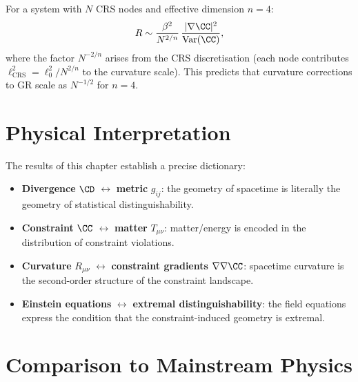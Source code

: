 \begin{corollary}\label{cor:15.5}
For a system with $N$ CRS nodes and effective dimension $n = 4$:
\begin{equation}\label{eq:observable-scaling}
  R \sim \frac{\beta^2}{N^{2/n}}\,
  \frac{|\nabla\CC|^2}{\mathrm{Var}(\CC)},
\end{equation}
where the factor $N^{-2/n}$ arises from the CRS discretisation
(each node contributes $\ell_{\mathrm{CRS}}^2 = \ell_0^2/N^{2/n}$
to the curvature scale).  This predicts that curvature corrections
to GR scale as $N^{-1/2}$ for $n = 4$.
\end{corollary}

\section{Physical Interpretation}
\label{sec:ch15:interpretation}

\begin{remark}[Interpretation: Information $=$ Geometry $=$ Gravity]
The results of this chapter establish a precise dictionary:
\begin{itemize}
  \item \textbf{Divergence} $\CD$ $\leftrightarrow$ \textbf{metric}
        $g_{ij}$: the geometry of spacetime is literally the geometry
        of statistical distinguishability.
  \item \textbf{Constraint} $\CC$ $\leftrightarrow$ \textbf{matter}
        $T_{\mu\nu}$: matter/energy is encoded in the distribution of
        constraint violations.
  \item \textbf{Curvature} $R_{\mu\nu}$ $\leftrightarrow$
        \textbf{constraint gradients} $\nabla\nabla\CC$:
        spacetime curvature is the second-order structure of the
        constraint landscape.
  \item \textbf{Einstein equations} $\leftrightarrow$
        \textbf{extremal distinguishability}: the field equations
        express the condition that the constraint-induced geometry is
        extremal.
\end{itemize}
\end{remark}

\section{Comparison to Mainstream Physics}
\label{sec:ch15:comparison}

